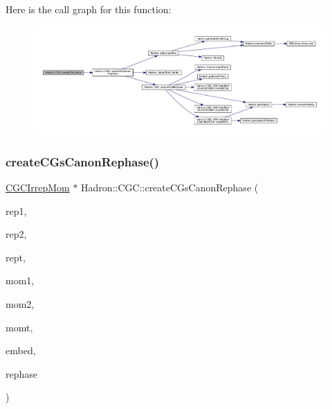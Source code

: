 Here is the call graph for this function\+:\nopagebreak
\begin{figure}[H]
\begin{center}
\leavevmode
\includegraphics[width=350pt]{d9/d19/namespaceHadron_1_1CGC_a416e4eef9b4975ce970e2e0ff04a09e6_cgraph}
\end{center}
\end{figure}
\mbox{\label{namespaceHadron_1_1CGC_a47b736ab1ac22edb39f4b0df589a7053}} 
\subsubsection{\texorpdfstring{createCGsCanonRephase()}{createCGsCanonRephase()}}
{\footnotesize\ttfamily \mbox{\hyperlink{classHadron_1_1CGCIrrepMom}{C\+G\+C\+Irrep\+Mom}} $\ast$ Hadron\+::\+C\+G\+C\+::create\+C\+Gs\+Canon\+Rephase (\begin{DoxyParamCaption}\item[{const std\+::string \&}]{rep1,  }\item[{const std\+::string \&}]{rep2,  }\item[{const std\+::string \&}]{rept,  }\item[{const Array\+Int \&}]{mom1,  }\item[{const Array\+Int \&}]{mom2,  }\item[{const Array\+Int \&}]{momt,  }\item[{int}]{embed,  }\item[{bool}]{rephase }\end{DoxyParamCaption})}

